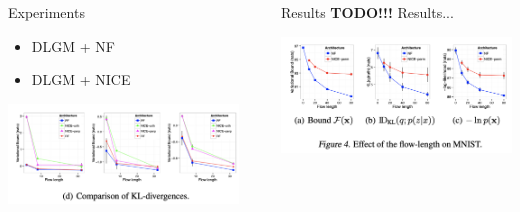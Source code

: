 \documentclass[final,hyperref={pdfpagelabels=false}]{beamer}
\newcommand{\shrink}{-15pt}
\begin{document}
\begin{frame}[t]
\begin{columns}[t]
\begin{column}{.3\textwidth}
      \begin{block}{Experiments}
      \begin{itemize}
      	\item DLGM + NF
      	\item DLGM + NICE
      \end{itemize}
      
      \end{block}
      
      
	\begin{center}
        \includegraphics[width=0.9\columnwidth]{varbound}
      \end{center}

  \end{column} %
  


  \begin{column}{.02\textwidth}\end{column} %

  \begin{column}{.3\textwidth} %

    \vspace{\shrink} 
    \begin{block}{Results}
        \textbf{TODO!!!}         
      Results...
    \end{block}
    
       \begin{center}
        \includegraphics[width=0.9\columnwidth]{flowlen}
      \end{center}
    

\end{column}
\end{columns}
\end{frame}
\end{document}
